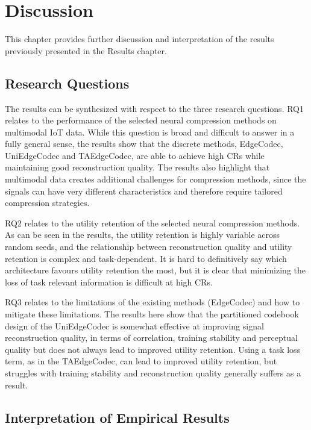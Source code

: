 \chapter{Discussion}
\label{chap:discussion}

This chapter provides further discussion and interpretation of the results previously presented in the Results chapter. 

\section{Research Questions} 

The results can be synthesized with respect to the three research questions. RQ1 relates to the performance of the selected neural compression methods on multimodal IoT data. While this question is broad and difficult to answer in a fully general sense, the results show that the discrete methods, EdgeCodec, UniEdgeCodec and TAEdgeCodec, are able to achieve high CRs while maintaining good reconstruction quality. The results also highlight that multimodal data creates additional challenges for compression methods, since the signals can have very different characteristics and therefore require tailored compression strategies. 

RQ2 relates to the utility retention of the selected neural compression methods. As can be seen in the results, the utility retention is highly variable across random seeds, and the relationship between reconstruction quality and utility retention is complex and task-dependent. It is hard to definitively say which architecture favours utility retention the most, but it is clear that minimizing the loss of task relevant information is difficult at high CRs. 

RQ3 relates to the limitations of the existing methods (EdgeCodec) and how to mitigate these limitations. The results here show that the partitioned codebook design of the UniEdgeCodec is somewhat effective at improving signal reconstruction quality, in terms of correlation, training stability and perceptual quality but does not always lead to improved utility retention. Using a task loss term, as in the TAEdgeCodec, can lead to improved utility retention, but struggles with training stability and reconstruction quality generally suffers as a result. 

\section{Interpretation of Empirical Results} 


